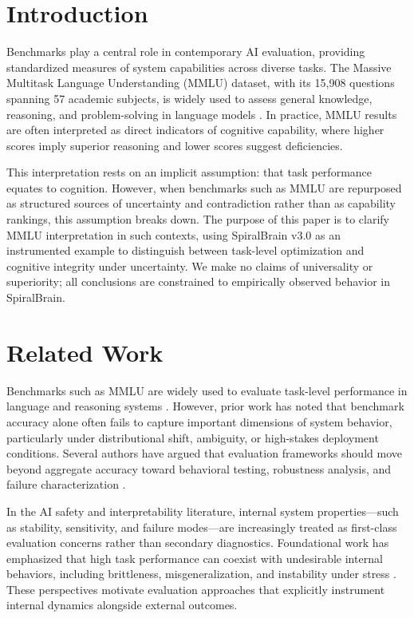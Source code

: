\documentclass[12pt,a4paper]{article}
\begin{document}
\section{Introduction}

Benchmarks play a central role in contemporary AI evaluation, providing standardized measures of system capabilities across diverse tasks. The Massive Multitask Language Understanding (MMLU) dataset, with its 15,908 questions spanning 57 academic subjects, is widely used to assess general knowledge, reasoning, and problem-solving in language models \cite{hendrycks2020measuring}. In practice, MMLU results are often interpreted as direct indicators of cognitive capability, where higher scores imply superior reasoning and lower scores suggest deficiencies.

This interpretation rests on an implicit assumption: that task performance equates to cognition. However, when benchmarks such as MMLU are repurposed as structured sources of uncertainty and contradiction rather than as capability rankings, this assumption breaks down. The purpose of this paper is to clarify MMLU interpretation in such contexts, using SpiralBrain v3.0 as an instrumented example to distinguish between task-level optimization and cognitive integrity under uncertainty. We make no claims of universality or superiority; all conclusions are constrained to empirically observed behavior in SpiralBrain.

\section{Related Work}

Benchmarks such as MMLU are widely used to evaluate task-level performance in language and reasoning systems \cite{hendrycks2020measuring}. However, prior work has noted that benchmark accuracy alone often fails to capture important dimensions of system behavior, particularly under distributional shift, ambiguity, or high-stakes deployment conditions. Several authors have argued that evaluation frameworks should move beyond aggregate accuracy toward behavioral testing, robustness analysis, and failure characterization \cite{raji2021beyond, ethayarajh2020utility}.

In the AI safety and interpretability literature, internal system properties—such as stability, sensitivity, and failure modes—are increasingly treated as first-class evaluation concerns rather than secondary diagnostics. Foundational work has emphasized that high task performance can coexist with undesirable internal behaviors, including brittleness, misgeneralization, and instability under stress \cite{amodei2016concrete, olah2018building}. These perspectives motivate evaluation approaches that explicitly instrument internal dynamics alongside external outcomes.
\end{document}

